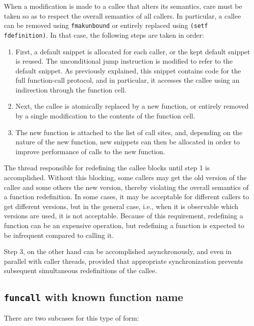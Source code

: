 When a modification is made to a callee that alters its semantics,
care must be taken so as to respect the overall semantics of all
callers.  In particular, a callee can be removed using
\texttt{fmakunbound} or entirely replaced using \texttt{(setf
  fdefinition)}.  In that case, the following steps are taken in
order:

\begin{enumerate}
\item First, a default snippet is allocated for each caller, or the
  kept default snippet is reused.  The unconditional jump instruction
  is modified to refer to the default snippet.  As previously
  explained, this snippet contains code for the full function-call
  protocol, and in particular, it accesses the callee using an
  indirection through the function cell.
\item Next, the callee is atomically replaced by a new function, or
  entirely removed by a single modification to the contents of the
  function cell.
\item The new function is attached to the list of call sites, and,
  depending on the nature of the new function, new snippets can then
  be allocated in order to improve performance of calls to the new
  function.
\end{enumerate}

\noindent
The thread responsible for redefining the callee blocks until step 1
is accomplished.  Without this blocking, some callers may get the old
version of the callee and some others the new version, thereby
violating the overall semantics of a function redefinition.  In some
cases, it may be acceptable for different callers to get different
versions, but in the general case, i.e., when it is observable which
versions are used, it is not acceptable.  Because of this requirement,
redefining a function can be an expensive operation, but redefining a
function is expected to be infrequent compared to calling it.

Step 3, on the other hand can be accomplished asynchronously, and even
in parallel with caller threads, provided that appropriate
synchronization prevents subsequent simultaneous redefinitions of the
callee.

\subsection{\texttt{funcall} with known function name}

There are two subcases for this type of form:

